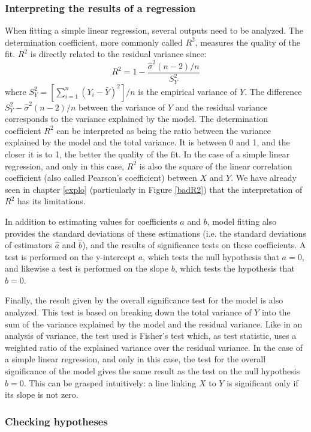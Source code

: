 \subsubsection{Interpreting the results of a regression}

When fitting a simple linear regression, several outputs need to be analyzed. The determination coefficient, more commonly called $R^2$, measures the quality of the fit. $R^2$ is directly related to the residual variance since:
\[
R^2=1-\frac{\hat{\sigma}^2(n-2)/n}{S_Y^2}
\]
where $S_Y^2=[\sum_{i=1}^n(Y_i-\bar{Y})^2]/n$ is the empirical variance of $Y$. The difference $S_Y^2-\hat{\sigma}^2(n-2)/n$ between the variance of $Y$ and the residual variance corresponds to the variance explained by the model. The determination coefficient $R^2$ can be interpreted as being the ratio between the variance explained by the model and the total variance. It is between 0 and 1, and the closer it is to 1, the better the quality of the fit. In the case of a simple linear regression, and only in this case, $R^2$ is also the square of the linear correlation coefficient (also called Pearson's coefficient) between $X$ and $Y$. We have already seen in chapter \ref{explo} (particularly in  Figure \ref{badR2}) that the interpretation of $R^2$ has its limitations.

In addition to estimating values for coefficients $a$ and $b$, model fitting also provides the standard deviations of these estimations (i.e. the standard deviations of estimators $\hat{a}$ and $\hat{b}$), and the results of significance tests on these coefficients. A test is performed on the y-intercept $a$, which tests the null hypothesis that $a=0$, and likewise a test is performed on the slope $b$, which tests the hypothesis that $b=0$.

Finally, the result given by the overall significance test for the model is also analyzed. This test is based on breaking down the total variance of $Y$ into the sum of the variance explained by the model and the residual variance. Like in an analysis of variance, the test used is Fisher's test which, as test statistic, uses a weighted ratio of the explained variance over the residual variance. In the case of a simple linear regression, and only in this case, the test for the overall significance of the model gives the same result as the test on the null hypothesis $b=0$. This can be grasped intuitively: a line linking $X$ to $Y$ is significant only if its slope is not zero.


\subsubsection{Checking hypotheses}


